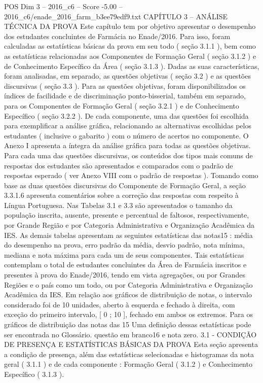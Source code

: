 \begin{textsample}{POS Dim 3 – 2016\_c6 – Score -5.00 – 2016\_c6/enade\_2016\_farm\_b3ee79edf9.txt}  \label{ex:f3_pos_255}
CAPÍTULO 3 – ANÁLISE TÉCNICA DA PROVA Este capítulo tem por objetivo apresentar o desempenho dos estudantes concluintes de Farmácia no Enade/2016.
Para isso, foram calculadas as estatísticas básicas da prova em seu todo ( seção 3.1.1 ), bem como as estatísticas relacionadas aos Componentes de Formação Geral ( seção 3.1.2 ) e de Conhecimento Específico da Área ( seção 3.1.3 ).
Dadas as suas características, foram analisadas, em separado, as questões objetivas ( seção 3.2 ) e as questões discursivas ( seção 3.3 ).
Para as questões objetivas, foram disponibilizados os índices de facilidade e de discriminação ponto-bisserial, também em separado, para os Componentes de Formação Geral ( seção 3.2.1 ) e de Conhecimento Específico ( seção 3.2.2 ).
De cada componente, uma das questões foi escolhida para exemplificar a análise gráfica, relacionando as alternativas escolhidas pelos estudantes ( inclusive o gabarito ) com o número de acertos no componente.
O Anexo I apresenta a íntegra da análise gráfica para todas as questões objetivas.
Para cada uma das questões discursivas, os conteúdos dos tipos mais comuns de respostas dos estudantes são apresentados e comparados com o padrão de respostas esperado ( ver Anexo VIII com o padrão de respostas ).
Tomando como base as duas questões discursivas do Componente de Formação Geral, a seção 3.3.1.6 apresenta comentários sobre a correção das respostas com respeito à Língua Portuguesa.
Nas Tabelas 3.1 e 3.3 são apresentados o tamanho da população inscrita, ausente, presente e percentual de faltosos, respectivamente, por Grande Região e por Categoria Administrativa e Organização Acadêmica da IES.
As demais tabelas apresentam as seguintes estatísticas das notas15 : média do desempenho na prova, erro padrão da média, desvio padrão, nota mínima, mediana e nota máxima para cada um de seus componentes.
Tais estatísticas contemplam o total de estudantes concluintes da Área de Farmácia inscritos e presentes à prova do Enade/2016, tendo em vista agregações, ou por Grandes Regiões e o país como um todo, ou por Categoria Administrativa e Organização Acadêmica da IES.
Em relação aos gráficos de distribuição de notas, o intervalo considerado foi de 10 unidades, aberto à esquerda e fechado à direita, com exceção do primeiro intervalo, [ 0 ; 10 ], fechado em ambos os extremos.
Para os gráficos de distribuição das notas das 15 Uma definição dessas estatísticas pode ser encontrada no Glossário. questão em branco16 e nota zero. 3.1 - CONDIÇÃO DE PRESENÇA E ESTATÍSTICAS BÁSICAS DA PROVA Esta seção apresenta a condição de presença, além das estatísticas selecionadas e histogramas da nota geral ( 3.1.1 ) e de cada componente : Formação Geral ( 3.1.2 ) e Conhecimento Específico ( 3.1.3 ).

\end{textsample}
